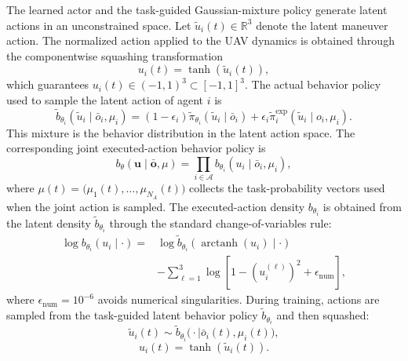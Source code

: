 \documentclass{cja}
\begin{document}
The learned actor and the task-guided Gaussian-mixture policy generate latent actions in an unconstrained space. Let $\widetilde u_i(t)\in\mathbb R^3$ denote the latent maneuver action. The normalized action applied to the UAV dynamics is obtained through the componentwise squashing transformation
\begin{equation}
u_i(t)
=
\tanh\!\left(\widetilde u_i(t)\right),
\end{equation}
which guarantees $u_i(t)\in(-1,1)^3\subset[-1,1]^3$.
The actual behavior policy used to sample the latent action of agent $i$ is
\begin{equation}
\widetilde b_{\theta_i}(\widetilde u_i\mid\bar o_i,\mu_i)
=
(1-\epsilon_i)\widetilde\pi_{\theta_i}(\widetilde u_i\mid\bar o_i)
+\epsilon_i\widetilde\pi_i^{\mathrm{exp}}(\widetilde u_i\mid o_i,\mu_i).
\end{equation}
This mixture is the behavior distribution in the latent action space.
The corresponding joint executed-action behavior policy is
\begin{equation}
b_\theta(\mathbf u\mid\bar{\mathbf o},\mu)
=
\prod_{i\in\mathcal A}b_{\theta_i}(u_i\mid\bar o_i,\mu_i),
\end{equation}
where $\mu(t)=\bigl(\mu_1(t),\ldots,\mu_{N_A}(t)\bigr)$ collects the task-probability vectors used when the joint action is sampled. The executed-action density $b_{\theta_i}$ is obtained from the latent density $\widetilde b_{\theta_i}$ through the standard change-of-variables rule:
\begin{equation}
\begin{aligned}
\log b_{\theta_i}(u_i\mid\cdot)
= {}&
\log
\widetilde b_{\theta_i}
\left(
\operatorname{arctanh}(u_i)\mid\cdot
\right)
\\
&-
\sum_{\ell=1}^{3}
\log
\left[
1-\left(u_i^{(\ell)}\right)^2+\epsilon_{\mathrm{num}}
\right],
\end{aligned}
\end{equation}
where $\epsilon_{\mathrm{num}}=10^{-6}$ avoids numerical singularities. During training, actions are sampled from the task-guided latent behavior policy $\widetilde b_{\theta_i}$ and then squashed:
\begin{equation}
\widetilde u_i(t)
\sim
\widetilde b_{\theta_i}
\bigl(\cdot\mid\bar o_i(t),\mu_i(t)\bigr),
\end{equation}
\begin{equation}
u_i(t)
=
\tanh\!\left(\widetilde u_i(t)\right).
\end{equation}
\end{document}
